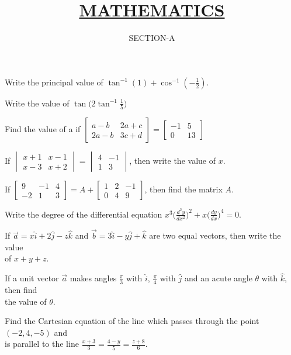 \documentclass[14pt]{exam}
\title{\underline{\textbf{MATHEMATICS}}}
\author{SECTION-A}
\date{}
\begin{document}
\maketitle
\begin{questions}
	\question Write the principal value of $\tan^{-1} (1)+\cos^{-1} (-\frac{1}{2})$.

	\question Write the value of $\tan \biggl(2 \tan^{-1} \frac{1}{5} \biggl)$

	\question Find the value of a if $\begin{bmatrix}
		a-b & 2a+c\\
		2a-b & 3c+d
	\end{bmatrix}
	=
	\begin{bmatrix}
		-1 & 5\\
		0 & 13
	\end{bmatrix}$

	\question If $\begin{vmatrix}
		x+1 & x-1\\
		x-3 & x+2
	\end{vmatrix}
	=
	\begin{vmatrix}
		4 & -1\\
		1 & 3
	\end{vmatrix}$, then write the value of $x$.

	\question If $\begin{bmatrix}
		9 & -1 & 4\\
		-2 & 1 & 3
	\end{bmatrix}
	=A+ \begin{bmatrix}
		1 & 2 & -1\\
		0 & 4 & 9
	\end{bmatrix}$, then find the matrix $A$.

	\question Write the degree of the differential equation $x^3 \biggl(\frac{d^2y}{dx^2} \biggl)^2+x \biggl(\frac{dy}{dx} \biggl)^4=0$.

	\question If $\vec{a}=x\hat{i}+2\hat{j}-z\hat{k}$ and $\vec{b}=3\hat{i}-y\hat{j}+\hat{k}$ are two equal vectors, then write the value\\ of $x+y+z$.
	
	\question If a unit vector $\vec{a}$ makes angles $\frac{\pi}{3}$ with $\hat{i}$, $\frac{\pi}{4}$ with $\hat{j}$ and an acute angle $\theta$ with $\hat{k}$, then find\\ the value of $\theta$.

	\question Find the Cartesian equation of the line which passes through the point $(-2,4,-5)$ and\\ is parallel to the line $\frac{x+3}{3}=\frac{4-y}{5}=\frac{z+8}{6}$.


\end{questions}
\end{document}
